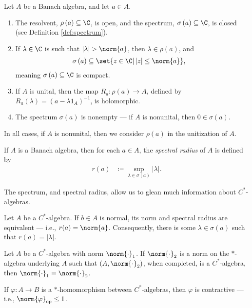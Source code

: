 \begin{theorem}\label{thm:spectrum_of_cstar_algebras}
  Let $A$ be a Banach algebra, and let $a\in A$.
  \begin{enumerate}[(1)]
    \item The resolvent, $\rho\left( a \right)\subseteq \C$, is open, and the spectrum, $\sigma\left( a \right)\subseteq \C$, is closed (see Definition \ref{def:spectrum}).
    \item If $\lambda\in\C$ is such that $\left\vert \lambda \right\vert > \norm{a}$, then $\lambda\in \rho(a)$, and 
      \begin{align*}
        \sigma\left( a \right) &\subseteq \set{z\in\C | \left\vert z \right\vert\leq \norm{a}},
      \end{align*}
      meaning $\sigma\left( a \right)\subseteq \C$ is compact.
    \item If $A$ is unital, then the map $R_a\colon \rho\left( a \right)\rightarrow A$, defined by $R_a\left( \lambda \right) = \left( a - \lambda 1_A \right)^{-1}$, is holomorphic.
    \item The spectrum $\sigma\left( a \right)$ is nonempty --- if $A$ is nonunital, then $0\in \sigma\left( a \right)$.
  \end{enumerate}
\end{theorem}
\begin{remark}
  In all cases, if $A$ is nonunital, then we consider $\rho\left( a \right)$ in the unitization of $A$.
\end{remark}
\begin{definition}{\cite[Definition 7.3.5]{rainone_analysis}}
  If $A$ is a Banach algebra, then for each $a\in A$, the \textit{spectral radius} of $A$ is defined by
  \begin{align*}
    r(a) &\coloneq \sup_{\lambda\in \sigma\left( a \right)}\left\vert \lambda \right\vert.
  \end{align*}
\end{definition}
The spectrum, and spectral radius, allow us to glean much information about $C^{\ast}$-algebras.
\begin{proposition}\label{prop:normal_spectral_radius}
  Let $A$ be a $C^{\ast}$-algebra. If $b\in A$ is normal, its norm and spectral radius are equivalent --- i.e., $r(a) =\norm{a} $. Consequently, there is some $\lambda\in \sigma\left( a \right)$ such that $r(a) = \left\vert \lambda \right\vert$.
\end{proposition}
\begin{proposition}\label{prop:cstar_norm_equivalent}
  Let $A$ be a $C^{\ast}$-algebra with norm $\norm{\cdot}_1$. If $\norm{\cdot}_2$ is a norm on the $\ast$-algebra underlying $A$ such that $\left( A,\norm{\cdot}_2 \right)$, when completed, is a $C^{\ast}$-algebra, then $\norm{\cdot}_1 = \norm{\cdot}_2$.
\end{proposition}
\begin{proposition}
  If $\varphi\colon A\rightarrow B$ is a $\ast$-homomorphism between $C^{\ast}$-algebras, then $\varphi$ is contractive --- i.e., $\norm{\varphi}_{\op}\leq 1$.
\end{proposition}

